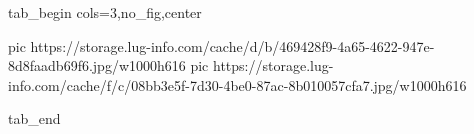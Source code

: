  
 
 
 
 


\ifcmt
  tab_begin cols=3,no_fig,center

     pic https://storage.lug-info.com/cache/d/b/469428f9-4a65-4622-947e-8d8faadb69f6.jpg/w1000h616%
		 pic https://storage.lug-info.com/cache/f/c/08bb3e5f-7d30-4be0-87ac-8b010057cfa7.jpg/w1000h616%

  tab_end
\fi
